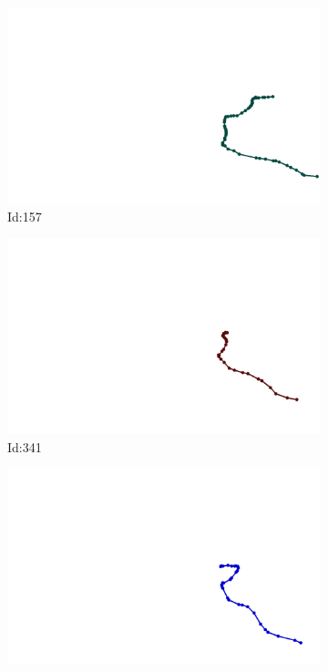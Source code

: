 \documentclass[12pt,twoside]{report}
\begin{document}
\begin{figure}
\centering
\begin{subfigure}[b]{0.20\textwidth}
\centering
\includegraphics[width=\textwidth]{../../trajectories/157.png}
\caption{Id:157}
\end{subfigure}
\begin{subfigure}[b]{0.20\textwidth}
\centering
\includegraphics[width=\textwidth]{../../trajectories/341.png}
\caption{Id:341}
\end{subfigure}
\begin{subfigure}[b]{0.20\textwidth}
\centering
\includegraphics[width=\textwidth]{../../trajectories/403.png}

\end{subfigure}
\end{figure}
\end{document}
